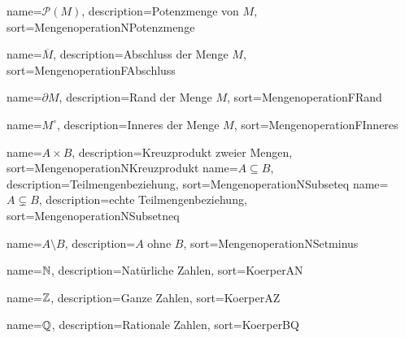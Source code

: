 
{
  name={\ensuremath{\mathcal{P}(M)}},
  description={Potenzmenge von $M$},
  sort=MengenoperationNPotenzmenge
}

{
  name={\ensuremath{\overline{M}}},
  description={Abschluss der Menge $M$},
  sort=MengenoperationFAbschluss
}

{
  name={\ensuremath{\partial M}},
  description={Rand der Menge $M$},
  sort=MengenoperationFRand
}

{
  name={\ensuremath{M^\circ}},
  description={Inneres der Menge $M$},
  sort=MengenoperationFInneres
}

{
  name={\ensuremath{A \times B}},
  description={Kreuzprodukt zweier Mengen},
  sort=MengenoperationNKreuzprodukt
}
{
  name={\ensuremath{A \subseteq B}},
  description={Teilmengenbeziehung},
  sort=MengenoperationNSubseteq
}
{
  name={\ensuremath{A \subsetneq B}},
  description={echte Teilmengenbeziehung},
  sort=MengenoperationNSubsetneq
}

{
  name={\ensuremath{A \setminus B}},
  description={$A$ ohne $B$},
  sort=MengenoperationNSetminus
}

{
  name={\ensuremath{\mdn}},
  description={Natürliche Zahlen},
  sort=KoerperAN
}

{
  name={\ensuremath{\mdz}},
  description={Ganze Zahlen},
  sort=KoerperAZ
}

{
  name={\ensuremath{\mdq}},
  description={Rationale Zahlen},
  sort=KoerperBQ
}

